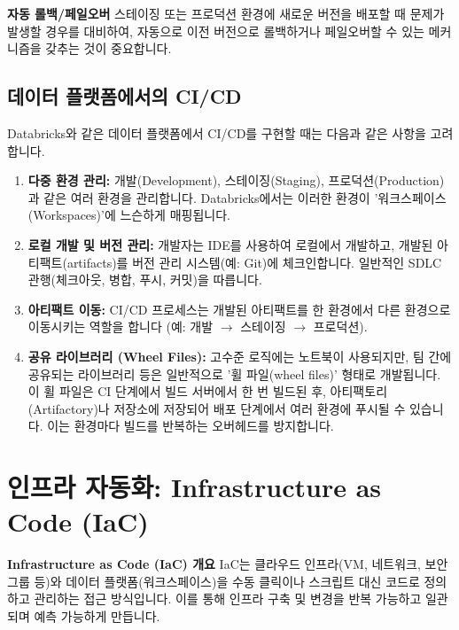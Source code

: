 \documentclass[11pt,a4paper]{article}
\begin{document}
\begin{warningbox}
\textbf{자동 롤백/페일오버}
스테이징 또는 프로덕션 환경에 새로운 버전을 배포할 때 문제가 발생할 경우를 대비하여, 자동으로 이전 버전으로 롤백하거나 페일오버할 수 있는 메커니즘을 갖추는 것이 중요합니다.
\end{warningbox}

\subsection{데이터 플랫폼에서의 CI/CD}
Databricks와 같은 데이터 플랫폼에서 CI/CD를 구현할 때는 다음과 같은 사항을 고려합니다.

\begin{enumerate}
    \item \textbf{다중 환경 관리:}
    개발(Development), 스테이징(Staging), 프로덕션(Production)과 같은 여러 환경을 관리합니다. Databricks에서는 이러한 환경이 '워크스페이스(Workspaces)'에 느슨하게 매핑됩니다.

    \item \textbf{로컬 개발 및 버전 관리:}
    개발자는 IDE를 사용하여 로컬에서 개발하고, 개발된 아티팩트(artifacts)를 버전 관리 시스템(예: Git)에 체크인합니다. 일반적인 SDLC 관행(체크아웃, 병합, 푸시, 커밋)을 따릅니다.

    \item \textbf{아티팩트 이동:}
    CI/CD 프로세스는 개발된 아티팩트를 한 환경에서 다른 환경으로 이동시키는 역할을 합니다 (예: 개발 $\rightarrow$ 스테이징 $\rightarrow$ 프로덕션).

    \item \textbf{공유 라이브러리 (Wheel Files):}
    고수준 로직에는 노트북이 사용되지만, 팀 간에 공유되는 라이브러리 등은 일반적으로 '휠 파일(wheel files)' 형태로 개발됩니다. 이 휠 파일은 CI 단계에서 빌드 서버에서 한 번 빌드된 후, 아티팩토리(Artifactory)나 저장소에 저장되어 배포 단계에서 여러 환경에 푸시될 수 있습니다. 이는 환경마다 빌드를 반복하는 오버헤드를 방지합니다.
\end{enumerate}

\newpage
\section{인프라 자동화: Infrastructure as Code (IaC)}

\begin{conceptbox}
\textbf{Infrastructure as Code (IaC) 개요}
IaC는 클라우드 인프라(VM, 네트워크, 보안 그룹 등)와 데이터 플랫폼(워크스페이스)을 수동 클릭이나 스크립트 대신 코드로 정의하고 관리하는 접근 방식입니다. 이를 통해 인프라 구축 및 변경을 반복 가능하고 일관되며 예측 가능하게 만듭니다.
\end{conceptbox}
\end{document}
